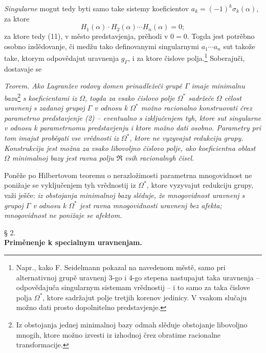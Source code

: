 \documentclass[11pt]{article}
\begin{document}
{\itshape Singularne} mogut tedy byti samo take sistemy koeficientov $a_k=(-1)^k\sigma_k(\alpha)$, za ktore
\[
H_1(\alpha)\cdot H_2(\alpha)\cdots H_n(\alpha)=0;
\]
za ktore tedy (11), v město predstavjenja, prěhodi v $0=0$. Togda jest potrěbno osobno izslědovanje, či medžu tako definovanymi singularnymi $a_1\cdots a_n$ sut takože take, ktorym odpovědajut uravnenja $g_\Gamma$, i za ktore čislove polja.\footnote{Napr., kako F. Seidelmann pokazal na navedenom městě, samo pri alternativnoj grupě uravnenj 3-go i 4-go stepena nastupajut taka uravnenja -- odpovědajuča singularnym sistemam vrědnostij -- i to samo za taka čislove polja $\Omega^*$, ktore sadržajut polje tretjih korenov jedinicy. V vsakom slučaju možno dati prosto dopolnitelno predstavjenje.} Soberajuči, dostavaje se

{\itshape Teorem. Ako Lagranžev rodovy domen prinadležeči grupě $\Gamma$ imaje minimalnu bazu}\footnote{Iz obstojanja jednej minimalnoj bazy odmah slěduje obstojanje libovoljno mnogih, ktore možno izvesti iz izhodnoj črez obratime racionalne transformacije.} {\itshape s koeficientami iz $\Omega$, togda za vsako čislovo polje $\Omega^*$ sadržeče $\Omega$ cělost uravnenj s zadanoj grupoj $\Gamma$ v odnosu k $\Omega^*$ možno racionalno konstruovati črez parametrno predstavjenje (2) -- eventualno s izključenjem tyh, ktore sut singularne v odnosu k parametrnomu predstavjenju i ktore možno dati osobno. Parametry pri tom imajut proběgati vse vrědnosti iz $\Omega^*$, ktore ne vyzyvajut redukciju grupy. Konstrukcija jest možna za vsako libovoljno čislovo polje, ako koeficientna oblast $\Omega$ minimalnoj bazy jest ravna polju $\mathfrak R$ vsih racionalnyh čisel.}

Poněže po Hilbertovom teoremu o nerazložimosti parametrna mnogovidnost ne ponižaje se vyključenjem tyh vrědnostij iz $\Omega^*$, ktore vyzyvajut redukciju grupy, važi ješče: {\itshape iz obstojanja minimalnoj bazy slěduje, že mnogovidnost uravnenj s grupoj $\Gamma$ v odnosu k $\Omega^*$ jest ravna mnogovidnosti uravnenj bez afekta; mnogovidnost ne ponižaje se afektom.}

\begin{center}
§ 2.\\[0.75\baselineskip]
\textbf{Priměnenje k specialnym uravnenjam.}
\end{center}
\end{document}
